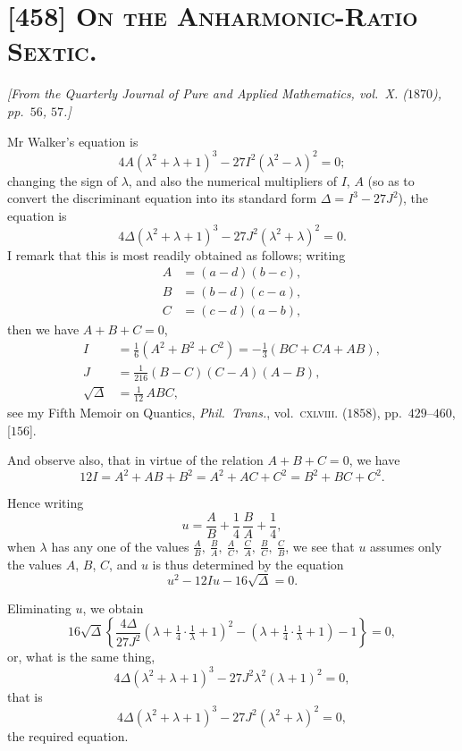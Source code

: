 \documentclass[11pt,a4paper]{article}
\begin{document}
\section*{[458] \textsc{On the Anharmonic-Ratio Sextic.}}

\begin{center}
\textit{[From the Quarterly Journal of Pure and Applied Mathematics,
vol.\ X. ($1870$), pp.\ $56$, $57$.]}
\end{center}

\medskip

Mr Walker's equation is
\[
4 A \left(\lambda^{2} + \lambda + 1\right)^{3}
- 27 I^{2} \left(\lambda^{2} - \lambda\right)^{2} = 0;
\]
changing the sign of $\lambda$, and also the numerical multipliers of $I$,
$A$ (so as to convert the discriminant equation into its standard form
$\Delta = I^{3} - 27 J^{2}$), the equation is
\[
4 \Delta \left(\lambda^{2} + \lambda + 1\right)^{3}
- 27 J^{2} \left(\lambda^{2} + \lambda\right)^{2} = 0.
\]
I remark that this is most readily obtained as follows; writing
\[
\begin{aligned}
A &= (a - d)(b - c),\\
B &= (b - d)(c - a),\\
C &= (c - d)(a - b),
\end{aligned}
\]
then we have $A + B + C = 0$,
\[
\begin{aligned}
I &= \tfrac{1}{6}(A^{2} + B^{2} + C^{2}) = -\tfrac{1}{3}(B C + C A + A B),\\
J &= \tfrac{1}{216}(B - C)(C - A)(A - B),\\
\sqrt{\Delta} &= \tfrac{1}{12}\,A B C,
\end{aligned}
\]
see my Fifth Memoir on Quantics, \textit{Phil.\ Trans.}, vol.\
\textsc{cxlviii.} ($1858$), pp.~$429$--$460$, [$156$].

And observe also, that in virtue of the relation $A + B + C = 0$, we have
\[
12 I = A^{2} + A B + B^{2} = A^{2} + A C + C^{2} = B^{2} + B C + C^{2}.
\]

Hence writing
\[
u = \frac{A}{B} + \frac{1}{4}\,\frac{B}{A} + \frac{1}{4},
\]
when $\lambda$ has any one of the values
\(\frac{A}{B},\ \frac{B}{A},\ \frac{A}{C},\ \frac{C}{A},\
\frac{B}{C},\ \frac{C}{B}\),
we see that $u$ assumes only the values $A$, $B$, $C$, and $u$ is thus
determined by the equation
\[
u^{2} - 12 I u - 16\sqrt{\Delta} = 0.
\]

Eliminating $u$, we obtain
\[
16\sqrt{\Delta}\left\{\frac{4 \Delta}{27 J^{2}}\left(\lambda
+ \tfrac{1}{4}\cdot\tfrac{1}{\lambda} + 1\right)^{2}
- \left(\lambda + \tfrac{1}{4}\cdot\tfrac{1}{\lambda} + 1\right) - 1\right\} = 0,
\]
or, what is the same thing,
\[
4 \Delta \left(\lambda^{2} + \lambda + 1\right)^{3}
- 27 J^{2} \lambda^{2} \left(\lambda + 1\right)^{2} = 0,
\]
that is
\[
4 \Delta \left(\lambda^{2} + \lambda + 1\right)^{3}
- 27 J^{2} \left(\lambda^{2} + \lambda\right)^{2} = 0,
\]
the required equation.
\end{document}
